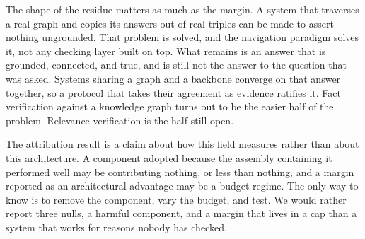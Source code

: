 The shape of the residue matters as much as the margin. A system that
traverses a real graph and copies its answers out of real triples can be
made to assert nothing ungrounded. That problem is solved, and the
navigation paradigm solves it, not any checking layer built on top. What
remains is an answer that is grounded, connected, and true, and is still
not the answer to the question that was asked. Systems sharing a graph
and a backbone converge on that answer together, so a protocol that
takes their agreement as evidence ratifies it. Fact verification against
a knowledge graph turns out to be the easier half of the problem.
Relevance verification is the half still open.

The attribution result is a claim about how this field measures rather
than about this architecture. A component adopted because the assembly
containing it performed well may be contributing nothing, or less than
nothing, and a margin reported as an architectural advantage may be a
budget regime. The only way to know is to remove the component, vary the
budget, and test. We would rather report three nulls, a harmful
component, and a margin that lives in a cap than a system that works for
reasons nobody has checked.
